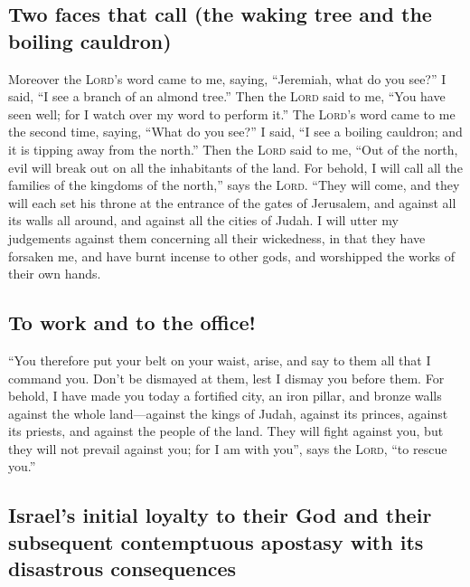 \hypertarget{two-faces-that-call-the-waking-tree-and-the-boiling-cauldron}{%
\subsection{Two faces that call (the waking tree and the boiling
cauldron)}\label{two-faces-that-call-the-waking-tree-and-the-boiling-cauldron}}

 Moreover the \textsc{Lord}'s word came to me, saying,
``Jeremiah, what do you see?'' I said, ``I see a branch of an almond
tree.''  Then the \textsc{Lord} said to me, ``You have
seen well; for I watch over my word to perform it.''  The
\textsc{Lord}'s word came to me the second time, saying, ``What do you
see?'' I said, ``I see a boiling cauldron; and it is tipping away from
the north.''  Then the \textsc{Lord} said to me, ``Out of
the north, evil will break out on all the inhabitants of the land.
 For behold, I will call all the families of the kingdoms
of the north,'' says the \textsc{Lord}. ``They will come, and they will
each set his throne at the entrance of the gates of Jerusalem, and
against all its walls all around, and against all the cities of Judah.
 I will utter my judgements against them concerning all
their wickedness, in that they have forsaken me, and have burnt incense
to other gods, and worshipped the works of their own hands.

\hypertarget{to-work-and-to-the-office}{%
\subsection{To work and to the
office!}\label{to-work-and-to-the-office}}

 ``You therefore put your belt on your waist, arise, and
say to them all that I command you. Don't be dismayed at them, lest I
dismay you before them.  For behold, I have made you
today a fortified city, an iron pillar, and bronze walls against the
whole land---against the kings of Judah, against its princes, against
its priests, and against the people of the land.  They
will fight against you, but they will not prevail against you; for I am
with you'', says the \textsc{Lord}, ``to rescue you.''

\hypertarget{israels-initial-loyalty-to-their-god-and-their-subsequent-contemptuous-apostasy-with-its-disastrous-consequences}{%
\subsection{Israel's initial loyalty to their God and their subsequent
contemptuous apostasy with its disastrous
consequences}\label{israels-initial-loyalty-to-their-god-and-their-subsequent-contemptuous-apostasy-with-its-disastrous-consequences}}

